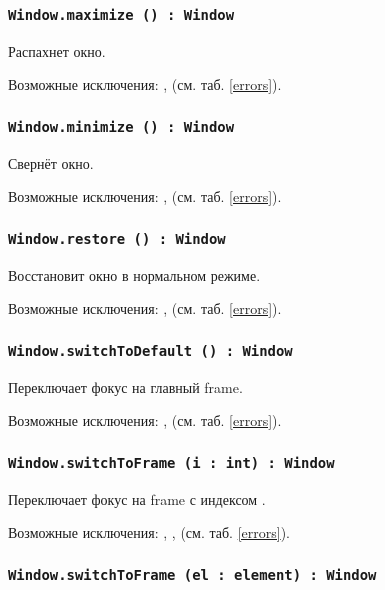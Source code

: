 \subsubsection{\lstinline|Window.maximize () : Window|}

Распахнет окно.

Возможные исключения: ,  (см. таб. \ref{errors}).

\subsubsection{\lstinline|Window.minimize () : Window|}

Свернёт окно.

Возможные исключения: ,  (см. таб. \ref{errors}).

\subsubsection{\lstinline|Window.restore () : Window|}

Восстановит окно в нормальном режиме.

Возможные исключения: ,  (см. таб. \ref{errors}).

\subsubsection{\lstinline|Window.switchToDefault () : Window|}

Переключает фокус на главный frame.

Возможные исключения: ,  (см. таб. \ref{errors}).

\subsubsection{\lstinline|Window.switchToFrame (i : int) : Window|}

Переключает фокус на frame с индексом .

Возможные исключения: , ,  (см. таб. \ref{errors}).

\subsubsection{\lstinline|Window.switchToFrame (el : element) : Window|}

